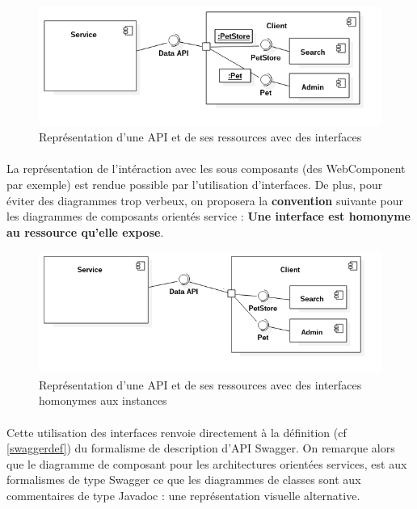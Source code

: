         \begin{figure}[h]
            \centering
            \includegraphics[scale=0.6]{./assets/UML/component3.png}
            \caption{Représentation d'une API et de ses ressources avec des interfaces}
        \end{figure}

        \paragraph{}
            La représentation de l'intéraction avec les sous composants (des WebComponent par exemple)
            est rendue possible par l'utilisation d'interfaces. De plus, pour éviter des diagrammes
            trop verbeux, on proposera la \textbf{convention} suivante pour les diagrammes de composants
            orientés service : \textbf{Une interface est homonyme au ressource qu'elle expose}.

        \begin{figure}[h]
            \centering
            \includegraphics[scale=0.6]{./assets/UML/component2.png}
            \caption{Représentation d'une API et de ses ressources avec des interfaces homonymes aux instances}
        \end{figure}

        \paragraph{}
            Cette utilisation des interfaces renvoie directement à la définition (cf \ref{swaggerdef})
            du formalisme de description d'API Swagger. On remarque alors que le diagramme de composant pour
            les architectures orientées services, est aux formalismes de type Swagger ce que les diagrammes
            de classes sont aux commentaires de type Javadoc : une représentation visuelle alternative.

